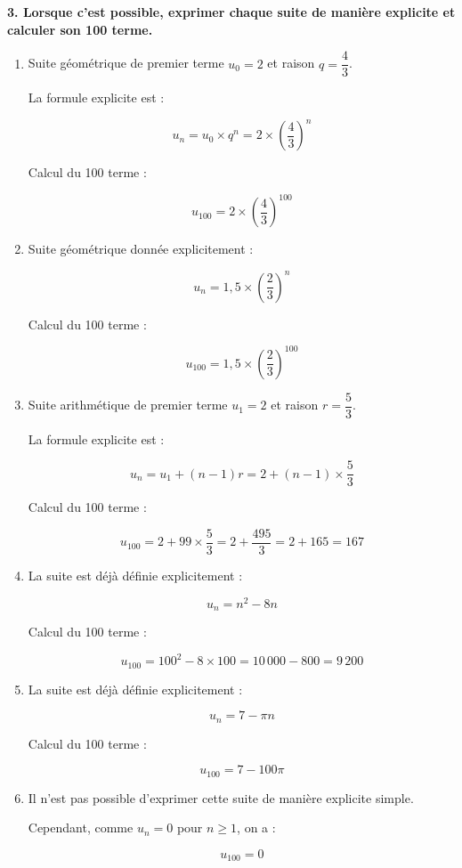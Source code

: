 \documentclass{article}
\begin{document}
\bigskip

\textbf{3. Lorsque c'est possible, exprimer chaque suite de manière explicite et calculer son 100\ieme{} terme.}

\begin{enumerate}[label=\alph*)]

\item Suite géométrique de premier terme \( u_0 = 2 \) et raison \( q = \dfrac{4}{3} \).

La formule explicite est :

\[ u_n = u_0 \times q^n = 2 \times \left( \dfrac{4}{3} \right)^n \]

Calcul du 100\ieme{} terme :

\[ u_{100} = 2 \times \left( \dfrac{4}{3} \right)^{100} \]

\bigskip

\item Suite géométrique donnée explicitement :

\[ u_n = 1{,}5 \times \left( \dfrac{2}{3} \right)^n \]

Calcul du 100\ieme{} terme :

\[ u_{100} = 1{,}5 \times \left( \dfrac{2}{3} \right)^{100} \]

\bigskip

\item Suite arithmétique de premier terme \( u_1 = 2 \) et raison \( r = \dfrac{5}{3} \).

La formule explicite est :

\[ u_n = u_1 + (n - 1) r = 2 + (n - 1) \times \dfrac{5}{3} \]

Calcul du 100\ieme{} terme :

\[ u_{100} = 2 + 99 \times \dfrac{5}{3} = 2 + \dfrac{495}{3} = 2 + 165 = 167 \]

\bigskip

\item La suite est déjà définie explicitement :

\[ u_n = n^2 - 8n \]

Calcul du 100\ieme{} terme :

\[ u_{100} = 100^2 - 8 \times 100 = 10\,000 - 800 = 9\,200 \]

\bigskip

\item La suite est déjà définie explicitement :

\[ u_n = 7 - \pi n \]

Calcul du 100\ieme{} terme :

\[ u_{100} = 7 - 100 \pi \]

\bigskip

\item Il n'est pas possible d'exprimer cette suite de manière explicite simple.

Cependant, comme \( u_n = 0 \) pour \( n \geq 1 \), on a :

\[ u_{100} = 0 \]

\end{enumerate}
\end{document}
